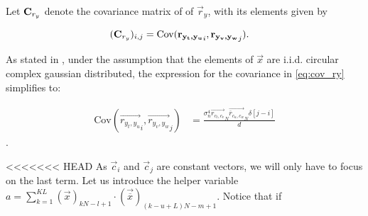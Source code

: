 \documentclass[a4paper, openany, oneside]{memoir}
\begin{document}
Let $\boldsymbol{\mathbf{C}}_{r_y}$ denote the covariance matrix of of $\vec{r}_y$, with its elements given by

\begin{align}\label{eq:cov_ry}
(\boldsymbol{\mathbf{C}}_{r_y})_{i,j} &= \text{Cov}(\boldsymbol{\mathbf{r_{y_t,y_u}}}_i,\boldsymbol{\mathbf{r_{y_v, y_w}}}_j).
\end{align}

As stated in \cite{ariananda2012compressive}, under the assumption that the elements of $\vec{x}$ are i.i.d. circular complex gaussian distributed, the expression for the covariance in \cref{eq:cov_ry} simplifies to:

\begin{align*}
\text{Cov}(\vec{r_{y_t,y_u}}_i,\vec{r_{y_v, y_w}}_j) &= \frac{\sigma_n^4 \vec{r_{c_t,c_v}}_N \vec{\overline{r}_{c_u,c_w}}_N \delta \left[ j-i\right]}{d}
\end{align*}.

<<<<<<< HEAD
As $\vec{c}_i$ and $\vec{c}_j$ are constant vectors, we will only have to focus on the last term. Let us introduce the helper variable $a =  \sum_{k=1}^{KL} (\vec{x})_{kN-l+1} \cdot (\vec{\overline{x}})_{(k-u+L)N - m+1}$. Notice that if
\end{document}
